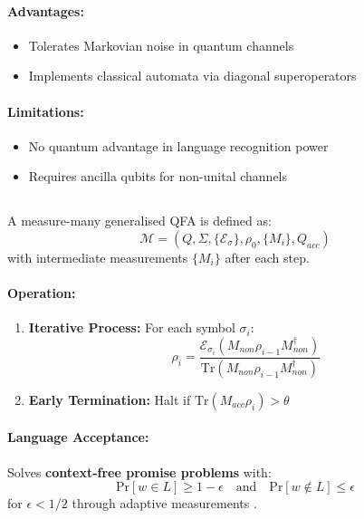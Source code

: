 \paragraph{Advantages:}
\begin{itemize}
    \item Tolerates Markovian noise in quantum channels
    \item Implements classical automata via diagonal superoperators
\end{itemize}

\paragraph{Limitations:}
\begin{itemize}
    \item No quantum advantage in language recognition power
    \item Requires ancilla qubits for non-unital channels
\end{itemize}

\subsection{}
\label{subsec:mm-1gqfa}

\begin{definition}
A measure-many generalised QFA is defined as:
\[
\mathcal{M} = (Q, \Sigma, \{\mathcal{E}_\sigma\}, \rho_0, \{M_i\}, Q_{acc})
\]
with intermediate measurements $\{M_i\}$ after each step.
\end{definition}

\paragraph{Operation:}
\begin{enumerate}
    \item \textbf{Iterative Process:} For each symbol $\sigma_i$:
    \[
    \rho_i = \frac{\mathcal{E}_{\sigma_i}(M_{non}\rho_{i-1}M_{non}^\dagger)}{\text{Tr}(M_{non}\rho_{i-1}M_{non}^\dagger)}
    \]
    \item \textbf{Early Termination:} Halt if $\text{Tr}(M_{acc}\rho_i) > \theta$
\end{enumerate}

\paragraph{Language Acceptance:}
Solves \textbf{context-free promise problems} with:
\[
\text{Pr}[w \in L] \geq 1-\epsilon \quad \text{and} \quad \text{Pr}[w \notin L] \leq \epsilon
\]
for $\epsilon < 1/2$ through adaptive measurements \cite{hirvensalo2012quantum}.

